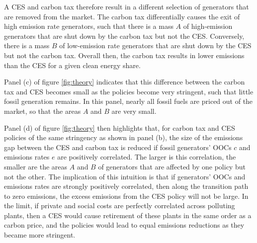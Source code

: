 \documentclass[12pt]{article}
\begin{document}
A CES and carbon tax therefore result in a different selection of generators that are removed from the market. The carbon tax differentially causes the exit of high emission rate generators, such that there is a mass $A$ of high-emission generators that are shut down by the carbon tax but not the CES. Conversely, there is a mass $B$ of low-emission rate generators that are shut down by the CES but not the carbon tax. Overall then, the carbon tax results in lower emissions than the CES for a given clean energy share.

Panel (c) of figure \ref{fig:theory} indicates that this difference between the carbon tax and CES becomes small as the policies become very stringent, such that little fossil generation remains. In this panel, nearly all fossil fuels are priced out of the market, so that the areas $A$ and $B$ are very small.

Panel (d) of figure \ref{fig:theory} then highlights that, for carbon tax and CES policies of the same stringency as shown in panel (b), the size of the emissions gap between the CES and carbon tax is reduced if fossil generators' OOCs $c$ and emissions rates $e$ are positively correlated. The larger is this correlation, the smaller are the areas $A$ and $B$ of generators that are affected by one policy but not the other. The implication of this intuition is that if generators' OOCs and emissions rates are strongly positively correlated, then along the transition path to zero emissions, the excess emissions from the CES policy will not be large. In the limit, if private and social costs are perfectly correlated across polluting plants, then a CES would cause retirement of these plants in the same order as a carbon price, and the policies would lead to equal emissions reductions as they became more stringent. 
\end{document}
